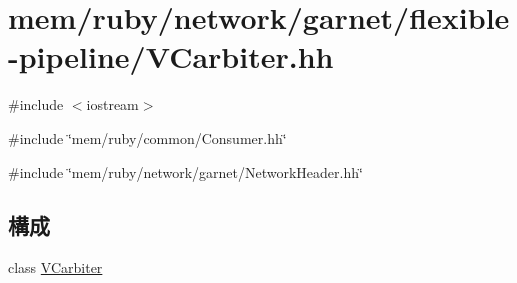 \hypertarget{VCarbiter_8hh}{
\section{mem/ruby/network/garnet/flexible-\/pipeline/VCarbiter.hh}
\label{VCarbiter_8hh}
}
{\ttfamily \#include $<$iostream$>$}\par
{\ttfamily \#include \char`\"{}mem/ruby/common/Consumer.hh\char`\"{}}\par
{\ttfamily \#include \char`\"{}mem/ruby/network/garnet/NetworkHeader.hh\char`\"{}}\par
\subsection*{構成}
\begin{DoxyCompactItemize}
\item 
class \hyperlink{classVCarbiter}{VCarbiter}
\end{DoxyCompactItemize}
